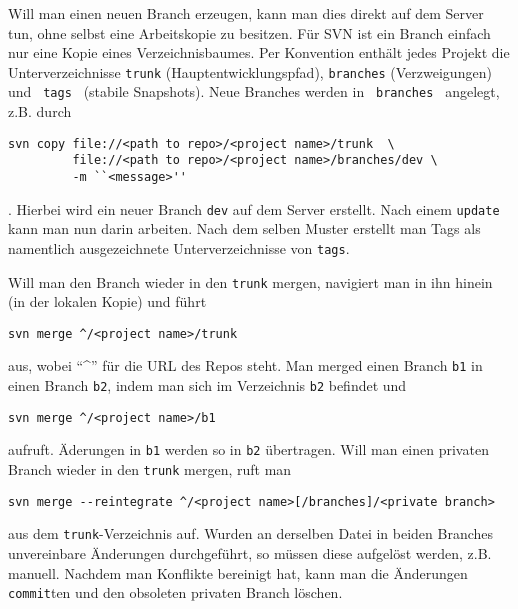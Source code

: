 \documentclass{scrartcl}
\begin{document}
Will man einen neuen Branch erzeugen, kann man dies direkt auf dem Server tun,
ohne selbst eine Arbeitskopie zu besitzen. Für SVN ist ein Branch einfach nur
eine Kopie eines Verzeichnisbaumes. Per Konvention enthält jedes Projekt die
Unterverzeichnisse \texttt{trunk} (Hauptentwicklungspfad), \texttt{branches}
(Verzweigungen) und \texttt{ tags } (stabile Snapshots). Neue Branches werden in
\texttt{ branches } angelegt, z.B. durch 
\begin{lstlisting}
svn copy file://<path to repo>/<project name>/trunk  \
         file://<path to repo>/<project name>/branches/dev \
         -m ``<message>''
\end{lstlisting} . Hierbei wird ein neuer Branch 
\texttt{dev} auf dem Server erstellt. Nach einem \texttt{update} kann man nun
darin arbeiten. Nach dem selben Muster erstellt man Tags als namentlich
ausgezeichnete Unterverzeichnisse von \texttt{tags}.

Will man den Branch wieder in den \texttt{trunk} mergen,
navigiert man in ihn hinein (in der lokalen Kopie) und führt
\begin{lstlisting}
svn merge ^/<project name>/trunk
\end{lstlisting} aus, wobei ``\^{}'' für die URL des Repos steht. 
Man merged einen Branch \texttt{b1} in einen Branch \texttt{b2}, indem man sich
im Verzeichnis \texttt{b2} befindet und 
\begin{lstlisting}
svn merge ^/<project name>/b1
\end{lstlisting}
aufruft. Äderungen in \texttt{b1} werden so in \texttt{b2} übertragen. Will man
einen privaten Branch wieder in den \texttt{trunk} mergen, ruft man
\begin{lstlisting}
svn merge --reintegrate ^/<project name>[/branches]/<private branch>
\end{lstlisting} aus dem \texttt{trunk}-Verzeichnis auf.
Wurden an derselben Datei in beiden Branches unvereinbare Änderungen
durchgeführt, so müssen diese aufgelöst werden, z.B. manuell. Nachdem man
Konflikte bereinigt hat, kann man die Änderungen \texttt{commit}ten und den
obsoleten privaten Branch löschen.
\end{document}
